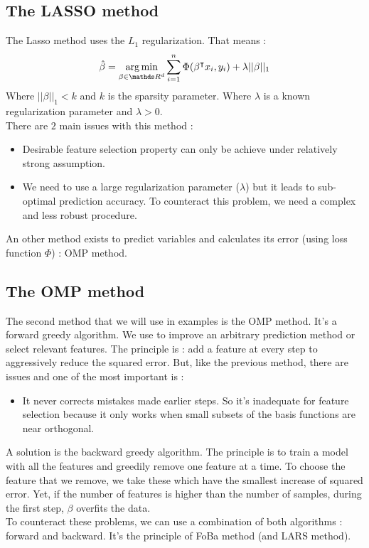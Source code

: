 \documentclass{article}
\begin{document}
\subsection{The LASSO method}
The Lasso method uses the $L_1$ regularization. That means :
\[\hat{\beta} = \underset{\beta \in \R^d}{\argmin} \sum_{i=1}^n \Phi (\trans{\beta}x_i, y_i)+ \lambda ||\beta||_1\]
Where $||\beta||_1<k$ and $k$ is the sparsity parameter. Where $\lambda$ is a known regularization parameter and $\lambda>0$.\\
There are $2$ main issues with this method : 
\begin{itemize}
    \item Desirable feature selection property can only be achieve under relatively strong assumption.
    \item We need to use a large regularization parameter ($\lambda$) but it leads to sub-optimal prediction accuracy. To counteract this problem, we need a complex and less robust procedure.
\end{itemize}
\vspace{0.5cm}
An other method exists to predict variables and calculates its error (using loss function $\Phi$) : OMP method.

\subsection{The OMP method}
The second method that we will use in examples is the OMP method. It's a forward greedy algorithm. We use to improve an arbitrary prediction method or select relevant features. The principle is : add a feature at every step to aggressively reduce the squared error. But, like the previous method, there are issues and one of the most important is :
\begin{itemize}
    \item It never corrects mistakes made earlier steps. So it's inadequate for feature selection because it only works when small subsets of the basis functions are near orthogonal.
\end{itemize}
A solution is the backward greedy algorithm. The principle is to train a model with all the features and greedily remove one feature at a time. To choose the feature that we remove, we take these which have the smallest increase of squared error. Yet, if the number of features is higher than the number of samples, during the first step, $\beta$ overfits the data.\\
To counteract these problems, we can use a combination of both algorithms : forward and backward. It's the principle of FoBa method (and LARS method).
\end{document}
